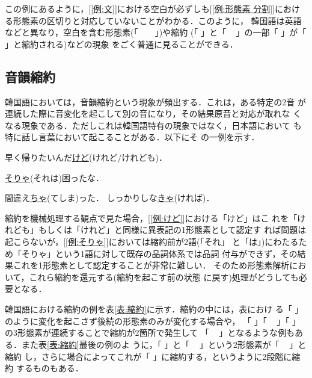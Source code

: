 この例にあるように，[\ref{例:文}]における空白が必ずしも[\ref{例:形態素
分割}]における形態素の区切りと対応していないことがわかる．このように，
韓国語は英語などと異なり，空白を含む形態素(「
\verb*| |
\verb*| |
」)や縮約
(「
」と「
\verb*| |
」の一部「
」が「
」と縮約される)などの現象
をごく普通に見ることができる．



\subsection{音韻縮約}

韓国語においては，音韻縮約という現象が頻出する．これは，ある特定の2音
が連続した際に音変化を起こして別の音になり，その結果原音と対応が取れな
くなる現象である．ただしこれは韓国語特有の現象ではなく，日本語において
も特に話し言葉において起こることがある\cite{基礎日本語文法}．以下にそ
の一例を示す．

\begin{example}
\item 早く帰りたいんだ\underline{けど}(けれど/けれども)．\label{例:けど}
\item \underline{そりゃ}(それは)困ったな．\label{例:そりゃ}
\item 間違え\underline{ちゃ}(てしま)った．
      しっかりしな\underline{きゃ}(ければ)．
\end{example}

縮約を機械処理する観点で見た場合，[\ref{例:けど}]における「けど」はこ
れを「けれども」もしくは「けれど」と同様に異表記の1形態素として認定す
れば問題は起こらないが，[\ref{例:そりゃ}]においては縮約前が2語(「それ」
と「は」)にわたるため「そりゃ」という1語に対して既存の品詞体系では品詞
付与ができず，その結果これを1形態素として認定することが非常に難しい．
そのため形態素解析において，これら縮約を還元する(縮約を起こす前の状態
に戻す)処理がどうしても必要となる．

韓国語における縮約の例を表\ref{表:縮約}に示す．縮約の中には，表におけ
る「
」のように変化を起こさず後続の形態素のみが変化する場合や，
「
」「
\verb*| |
」「
」の3形態素が連続することで縮約が2箇所で発生して
「
\verb*| |
」となるような例もある．また表\ref{表:縮約}最後の例のよ
うに，「
」と「
\verb*| |
」という2形態素が「
\verb*| |
」と縮約
し，さらに場合によってこれが「
」に縮約する，というように2段階に縮約
するものもある．

